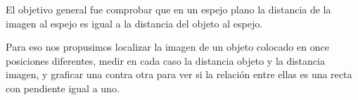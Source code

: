 El objetivo general fue comprobar que en un espejo plano la distancia de la imagen al espejo es igual a la distancia del objeto al espejo.

Para eso nos propusimos localizar la imagen de un objeto colocado en once posiciones diferentes, medir en cada caso la distancia objeto y la distancia imagen, y graficar una contra otra para ver si la relación entre ellas es una recta con pendiente igual a uno.
